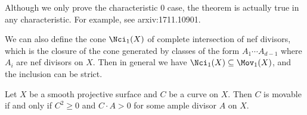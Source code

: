   \begin{remark}
    Although we only prove the characteristic $0$ case, the theorem is actually true in any characteristic.
    For example, see arxiv:1711.10901.
    \Yang{}
  \end{remark}

  \begin{remark}
    We can also define the cone $\Nci_1(X)$ of complete intersection of nef divisors, which is the closure of the cone generated by classes of the form $A_1 \cdots A_{d-1}$ where $A_i$ are nef divisors on $X$.
    Then in general we have $\Nci_1(X) \subseteq \Mov_1(X)$, and the inclusion can be strict.

    \Yang{}
  \end{remark}

  \begin{example}
    Let $X$ be a smooth projective surface and $C$ be a curve on $X$.
    Then $C$ is movable if and only if $C^2 \geq 0$ and $C \cdot A > 0$ for some ample divisor $A$ on $X$.
     \Yang{}
  \end{example}
